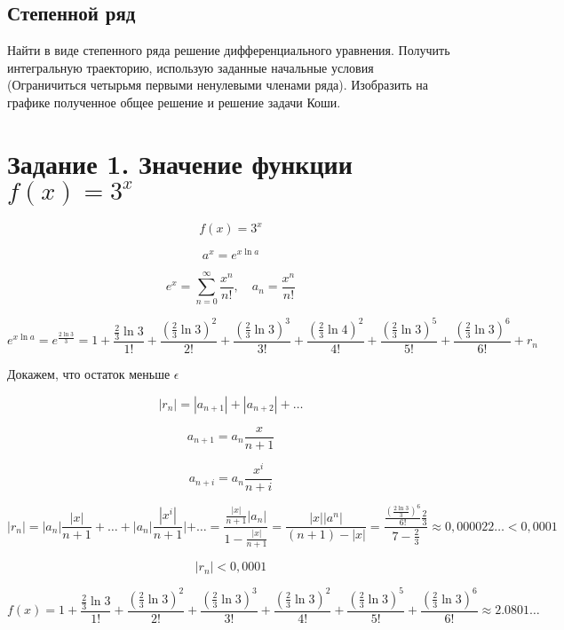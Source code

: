 \documentclass{article}
\renewcommand{\thesubsection}{Задание \arabic{subsection}.}
\begin{document}
\subsection{Степенной ряд}

Найти в виде степенного ряда решение дифференциального уравнения. Получить интегральную траекторию, использую заданные начальные условия (Ограничиться четырьмя первыми ненулевыми членами ряда). Изобразить на графике полученное общее решение и решение задачи Коши.


\renewcommand{\thesubsection}{\arabic{subsection}.}


\section{Задание 1. Значение функции $f(x) = 3^x$}

\[
f(x) = 3^x
\]

\[
a^x = e^{x\ln{a}}
\]

\[
e^x = \sum^\infty_{n=0}\frac{x^n}{n!}, \quad a_n = \frac{x^n}{n!}
\]

\[
e^{x\ln{a}} = e^{\frac{2\ln{3}}{3}} = 1 + \frac{\frac{2}{3}\ln{3}}{1!}  + \frac{(\frac{2}{3}\ln{3})^2}{2!} + \frac{(\frac{2}{3}\ln{3})^3}{3!} + \frac{(\frac{2}{3}\ln{4})^2}{4!} + \frac{(\frac{2}{3}\ln{3})^5}{5!} + \frac{(\frac{2}{3}\ln{3})^6}{6!} + r_n
\]

Докажем, что остаток меньше $\epsilon$

\[
|r_n| = |a_{n+1}| + |a_{n+2}| + \dots
\]

\[
a_{n+1} = a_n\frac{x}{n+1}
\]

\[
a_{n+i} = a_n\frac{x^i}{n+i}
\]

\[
|r_n| = |a_n|\frac{|x|}{n+1} + \dots + |a_n|\frac{|x^i|}{n+1}| + \dots = \frac{\frac{|x|}{n+1}|a_n|}{1-\frac{|x|}{n+1}} = \frac{|x||a^n|}{(n+1) - |x|} = \frac{\frac{(\frac{2\ln{3}}{3})^6}{6!}\frac{2}{3}}{7-\frac{2}{3}} \approx 0,000022 \dots < 0,0001
\]

\[
|r_n| < 0,0001 
\]

\[
f(x) = 1 + \frac{\frac{2}{3}\ln{3}}{1!}  + \frac{(\frac{2}{3}\ln{3})^2}{2!} + \frac{(\frac{2}{3}\ln{3})^3}{3!} + \frac{(\frac{2}{3}\ln{3})^2}{4!} + \frac{(\frac{2}{3}\ln{3})^5}{5!} + \frac{(\frac{2}{3}\ln{3})^6}{6!} \approx 2.0801 \dots
\]

\end{document}
